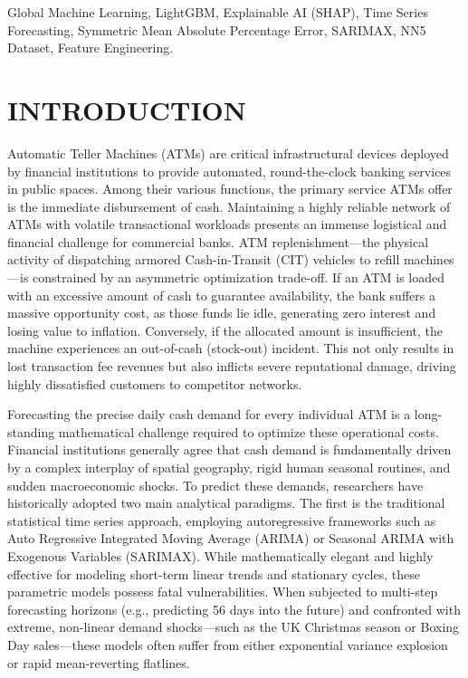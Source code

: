 \documentclass[conference, 12pt, onecolumn]{IEEEtran}
\begin{document}
\vspace{0.5cm}

\begin{IEEEkeywords}
\normalsize\raggedright
Global Machine Learning, LightGBM, Explainable AI (SHAP), Time Series Forecasting, Symmetric Mean Absolute Percentage Error, SARIMAX, NN5 Dataset, Feature Engineering.
\end{IEEEkeywords}

\section{INTRODUCTION}
Automatic Teller Machines (ATMs) are critical infrastructural devices deployed by financial institutions to provide automated, round-the-clock banking services in public spaces. Among their various functions, the primary service ATMs offer is the immediate disbursement of cash. Maintaining a highly reliable network of ATMs with volatile transactional workloads presents an immense logistical and financial challenge for commercial banks. ATM replenishment—the physical activity of dispatching armored Cash-in-Transit (CIT) vehicles to refill machines—is constrained by an asymmetric optimization trade-off. If an ATM is loaded with an excessive amount of cash to guarantee availability, the bank suffers a massive opportunity cost, as those funds lie idle, generating zero interest and losing value to inflation. Conversely, if the allocated amount is insufficient, the machine experiences an out-of-cash (stock-out) incident. This not only results in lost transaction fee revenues but also inflicts severe reputational damage, driving highly dissatisfied customers to competitor networks.

Forecasting the precise daily cash demand for every individual ATM is a long-standing mathematical challenge required to optimize these operational costs. Financial institutions generally agree that cash demand is fundamentally driven by a complex interplay of spatial geography, rigid human seasonal routines, and sudden macroeconomic shocks. To predict these demands, researchers have historically adopted two main analytical paradigms. The first is the traditional statistical time series approach, employing autoregressive frameworks such as Auto Regressive Integrated Moving Average (ARIMA) or Seasonal ARIMA with Exogenous Variables (SARIMAX). While mathematically elegant and highly effective for modeling short-term linear trends and stationary cycles, these parametric models possess fatal vulnerabilities. When subjected to multi-step forecasting horizons (e.g., predicting 56 days into the future) and confronted with extreme, non-linear demand shocks—such as the UK Christmas season or Boxing Day sales—these models often suffer from either exponential variance explosion or rapid mean-reverting flatlines. 
\end{document}
